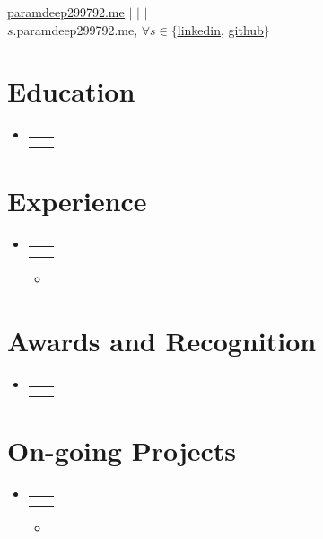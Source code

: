 \documentclass[letterpaper,11pt]{article}
\makeatletter
\newcommand{\resumeItem}[1]{
  \item\small{
    {#1 \vspace{-2pt}}
  }
}
\newcommand{\resumeSubheading}[4]{
  \vspace{-2pt}\item
    \begin{tabular*}{0.97\textwidth}[t]{l@{\extracolsep{\fill}}r}
      \textbf{#1} & #2 \\
      \textit{\small#3} & \textit{\small #4} \\
    \end{tabular*}\vspace{-7pt}
}
\newcommand{\resumeSubHeadingListStart}{\begin{itemize}[leftmargin=0.15in, label={}]}
\newcommand{\resumeSubHeadingListEnd}{\end{itemize}}
\newcommand{\resumeItemListStart}{\begin{itemize}}
\newcommand{\resumeItemListEnd}{\end{itemize}\vspace{-5pt}}
\makeatother
\begin{document}
\begin{center}
    \textbf{\Huge {}}
\end{center}

\begin{center}   
\href{\VAR{basics.website}}{\underline{paramdeep299792.me}} $|$
\href{mailto:\VAR{basics.email}}{\underline{}} $|$
\href{mailto:\VAR{basics.o_email}}{\underline{}} $|$ \\
$s$.paramdeep299792.me, $\forall s \in \{$\href{\VAR{basics.linkedin}}{\underline{linkedin}}, \href{\VAR{basics.github}}{\underline{github}}$\}$
\end{center}


\section{Education}
  \resumeSubHeadingListStart
    \resumeSubheading
      {\VAR{edu.institution}}{\VAR{edu.location}}
      {\VAR{edu.degree}}{\VAR{edu.dates}}
  \resumeSubHeadingListEnd

\section{Experience}
  \resumeSubHeadingListStart
    \resumeSubheading
      {\href{\VAR{exp.company_url}}{\underline{\VAR{exp.company}}}}{\VAR{exp.location}}
      {\VAR{exp.title}}{\VAR{exp.dates}}
      \resumeItemListStart
        \resumeItem{}
      \resumeItemListEnd
  \resumeSubHeadingListEnd

\section{Awards and Recognition}
  \resumeSubHeadingListStart
    \resumeSubheading
      {\VAR{award.title}}{\VAR{award.year}}
      {\VAR{award.description}}{\VAR{award.location | default('')}}
  \resumeSubHeadingListEnd

\section{On-going Projects}
  \resumeSubHeadingListStart
    \resumeSubheading
      {\VAR{proj.title}}{\VAR{proj.year}}
      {\VAR{proj.type}}{\VAR{proj.location | default('')}}
      \resumeItemListStart
        \resumeItem{}
      \resumeItemListEnd
  \resumeSubHeadingListEnd
\end{document}

